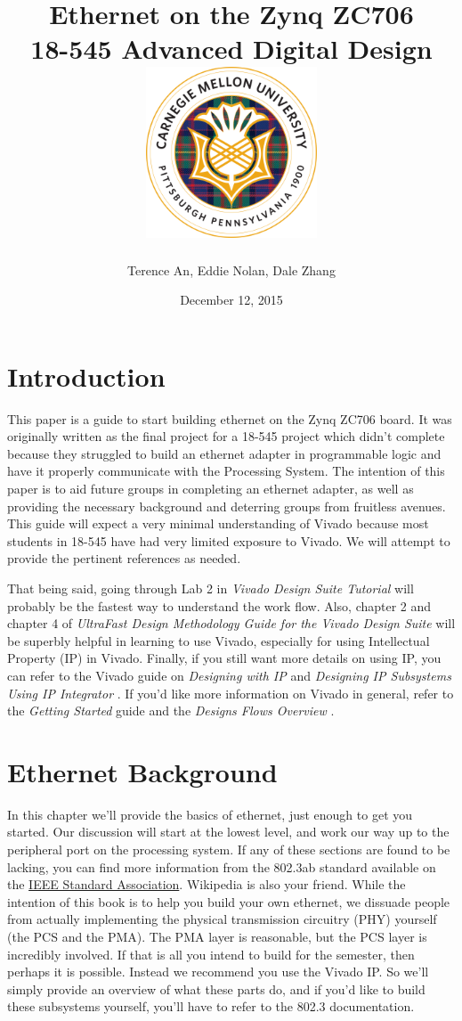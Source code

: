 \documentclass[12pt]{report}
\title{
  {Ethernet on the Zynq ZC706 \vspace{0.2in}}\\
  {\large 18-545 Advanced Digital Design \vspace{0.2in}}\\
  {\includegraphics[width=2in]{cmu_seal.png}}
}
\author{Terence An, Eddie Nolan, Dale Zhang}
\date{December 12, 2015}
\begin{document}
\maketitle

\chapter{Introduction}
This paper is a guide to start building ethernet on the Zynq ZC706 board. It was originally written as the final project for a 18-545 project which didn't complete because they struggled to build an ethernet adapter in programmable logic and have it properly communicate with the Processing System. The intention of this paper is to aid future groups in completing an ethernet adapter, as well as providing the necessary background and deterring groups from fruitless avenues. This guide will expect a very minimal understanding of Vivado because most students in 18-545 have had very limited exposure to Vivado. We will attempt to provide the pertinent references as needed.

That being said, going through Lab 2 in \textit{Vivado Design Suite Tutorial} \cite{vivado_tut} will probably be the fastest way to understand the work flow. Also, chapter 2 and chapter 4 of \textit{UltraFast Design Methodology Guide for the Vivado Design Suite} \cite{ultrafast} will be superbly helpful in learning to use Vivado, especially for using Intellectual Property (IP) in Vivado. Finally, if you still want more details on using IP, you can refer to the Vivado guide on \textit{Designing with IP} \cite{IP} and \textit{Designing IP Subsystems Using IP Integrator} \cite{IP_subsystems}. If you'd like more information on Vivado in general, refer to the \textit{Getting Started} \cite{starter} guide and the \textit{Designs Flows Overview} \cite{design_flows}.

\chapter{Ethernet Background}
In this chapter we'll provide the basics of ethernet, just enough to get you started.
Our discussion will start at the lowest level, and work our way up to the peripheral port on the processing system. If any of these sections are found to be lacking, you can find more information from the 802.3ab standard available on the \href{http://standards.ieee.org/about/get/802/802.3.html}{IEEE Standard Association}. Wikipedia is also your friend.
While the intention of this book is to help you build your own ethernet,
we dissuade people from actually implementing the physical transmission circuitry (PHY) yourself (the PCS and the PMA). The PMA layer is reasonable, but the PCS layer is incredibly involved. If that is all you intend to build for the semester, then perhaps it is possible. Instead we recommend you use the Vivado IP. So we'll simply provide an overview of what these parts do, and if you'd like to build these subsystems yourself, you'll have to refer to the 802.3 documentation.
\end{document}
